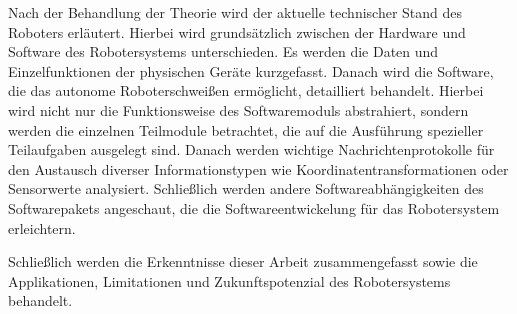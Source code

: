 Nach der Behandlung der Theorie wird der aktuelle technischer Stand des Roboters erläutert. Hierbei wird grundsätzlich zwischen der Hardware und Software des Robotersystems unterschieden. Es werden die Daten und Einzelfunktionen der physischen Geräte kurzgefasst. Danach wird die Software, die das autonome Roboterschweißen ermöglicht, detailliert behandelt. Hierbei wird nicht nur die Funktionsweise des Softwaremoduls abstrahiert, sondern werden die einzelnen Teilmodule betrachtet, die auf die Ausführung spezieller Teilaufgaben ausgelegt sind. Danach werden wichtige Nachrichtenprotokolle für den Austausch diverser Informationstypen wie Koordinatentransformationen oder Sensorwerte analysiert. Schließlich werden andere Softwareabhängigkeiten des Softwarepakets angeschaut, die die Softwareentwickelung für das Robotersystem erleichtern.

Schließlich werden die Erkenntnisse dieser Arbeit zusammengefasst sowie die Applikationen, Limitationen und Zukunftspotenzial des Robotersystems behandelt.